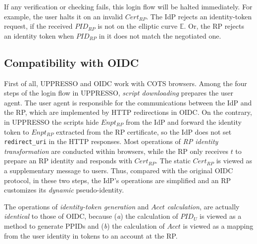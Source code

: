 If any verification or checking fails,
     this login flow will be halted immediately.
For example, the user halts it
    on an invalid $Cert_{RP}$.
The IdP rejects an identity-token request, if the received $PID_{RP}$ is not on the elliptic curve $\mathbb{E}$.
Or, the RP rejects an identity token
    when $PID_{RP}$ in it does not match the negotiated one.



\subsection{Compatibility with OIDC}
\label{subsec:compatible}
First of all, UPPRESSO and OIDC work with COTS browsers.
Among the four steps of the login flow in UPPRESSO,
    \emph{script downloading} prepares the user agent.
The user agent is responsible for the communications between the IdP and the RP,
    which are implemented by HTTP redirections in OIDC.
On the contrary, in UPPRESSO the scripts hide $Enpt_{RP}$ from the IdP
    and forward the identity token to $Enpt_{RP}$ extracted from the RP certificate,
so the IdP does not set \verb+redirect_uri+ in the HTTP responses. %
Most operations of \emph{RP identity transformation} are conducted within browsers,
 while the RP only receives $t$ to prepare an RP identity
  and responds with  $Cert_{RP}$.
The static $Cert_{RP}$ is viewed as a supplementary message to users.
Thus, compared with the original OIDC protocol, in these two steps, the IdP's operations are simplified
    and an RP customizes its \emph{dynamic} pseudo-identity.

The operations of \emph{identity-token generation} and \emph{$Acct$ calculation},
    are actually \emph{identical} to those of OIDC,
    because (\emph{a}) the calculation of $PID_U$ is viewed as a method to generate PPIDs
        and (\emph{b}) the calculation of $Acct$ is viewed as a mapping from the user identity in tokens
                    to an account at the RP.

